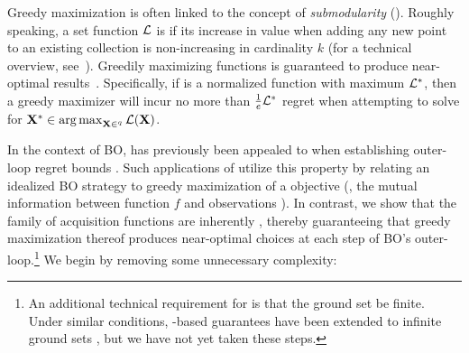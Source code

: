
Greedy maximization is often linked to the concept of \emph{submodularity} (\SM). Roughly speaking, a set function \(\mathcal{L}\) is \SM{} if its increase in value when adding any new point  to an existing collection  is non-increasing in cardinality \(k\) (for a technical overview, see~\cite{bach2013learning}). Greedily maximizing \SM{} functions is guaranteed to produce near-optimal results~\cite{minoux1978accelerated,nemhauser78,krause14}. Specifically, if \Acq{} is a normalized \SM{} function with maximum \(\mathcal{L}^{*}\), then a greedy maximizer will incur no more than \(\tfrac{1}{e}\mathcal{L}^{*}\) regret when attempting to solve for \(\opt{\X} \in \argmax_{\X \in \xspace^{\parallelism}} \Acq(\X)\).

In the context of BO, \SM{} has previously been appealed to when establishing outer-loop regret bounds \cite{srinivas10,contal2013parallel,desautels2014parallelizing}. Such applications of \SM{} utilize this property by relating an idealized BO strategy to greedy maximization of a \SM{} objective (\eg{}, the mutual information between \blackbox{} function \(f\) and observations \data{}). In contrast, we show that the family of \MM{} acquisition functions are inherently \SM, thereby guaranteeing that greedy maximization thereof produces near-optimal choices \X{} at each step of BO's outer-loop.\footnote{An additional technical requirement for \SM{} is that the ground set \xspace{} be finite. Under similar conditions, \SM-based guarantees have been extended to infinite ground sets \cite{srinivas10}, but we have not yet taken these steps.} We begin by removing some unnecessary complexity:

